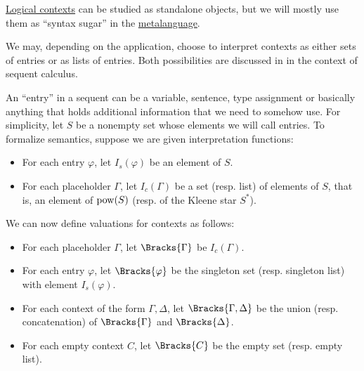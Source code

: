 \begin{remark}\label{rem:logical_context_semantics}
  \hyperref[def:logical_context]{Logical contexts} can be studied as standalone objects, but we will mostly use them as \enquote{syntax sugar} in the \hyperref[con:metalogic]{metalanguage}.

  We may, depending on the application, choose to interpret contexts as either sets of entries or as lists of entries. Both possibilities are discussed in  in the context of sequent calculus.

  An \enquote{entry} in a sequent can be a variable, sentence, type assignment or basically anything that holds additional information that we need to somehow use. For simplicity, let \( S \) be a nonempty set whose elements we will call entries. To formalize semantics, suppose we are given interpretation functions:
  \begin{itemize}
    \item For each entry \( \varphi \), let \( I_s(\varphi) \) be an element of \( S \).
    \item For each placeholder \( \Gamma \), let \( I_c(\Gamma) \) be a set (resp. list) of elements of \( S \), that is, an element of \( \operatorname{pow}(S) \) (resp. of the Kleene star \( S^* \)).
  \end{itemize}

  We can now define valuations for contexts as follows:
  \begin{itemize}
    \item For each placeholder \( \Gamma \), let \( \Bracks{\Gamma} \) be \( I_c(\Gamma) \).
    \item For each entry \( \varphi \), let \( \Bracks{\varphi} \) be the singleton set (resp. singleton list) with element \( I_s(\varphi) \).
    \item For each context of the form \( \Gamma, \Delta \), let \( \Bracks{\Gamma, \Delta} \) be the union (resp. concatenation) of \( \Bracks{\Gamma} \) and \( \Bracks{\Delta} \).
    \item For each empty context \( C \), let \( \Bracks{C} \) be the empty set (resp. empty list).
  \end{itemize}
\end{remark}

